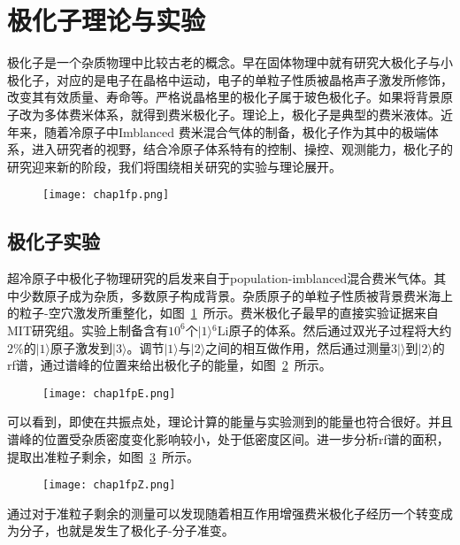 \section{极化子理论与实验}
极化子是一个杂质物理中比较古老的概念。早在固体物理中就有研究大极化子与小极化子\cite{landau1933bewegung,pekar1946autolocalization,frohlich1950xx,frohlich1954electrons,feynman1955slow,mahanmany}，对应的是电子在晶格中运动，电子的单粒子性质被晶格声子激发所修饰，改变其有效质量、寿命等。严格说晶格里的极化子属于玻色极化子。如果将背景原子改为多体费米体系，就得到费米极化子。理论上，极化子是典型的费米液体。近年来，随着冷原子中Imblanced 费米混合气体的制备，极化子作为其中的极端体系，进入研究者的视野，结合冷原子体系特有的控制、操控、观测能力，极化子的研究迎来新的阶段，我们将围绕相关研究的实验与理论展开。
\begin{figure}[!htbp]
    \centering
    \texttt{[image: chap1fp.png]}
    \label{fp}
\end{figure}

\subsection{极化子实验}
超冷原子中极化子物理研究的启发来自于population-imblanced混合费米气体。其中少数原子成为杂质，多数原子构成背景。杂质原子的单粒子性质被背景费米海上的粒子-空穴激发所重整化，如图~\ref{fp}~所示。费米极化子最早的直接实验证据来自MIT研究组\cite{Schirotzekobservation}。实验上制备含有$10^6$个$|1\rangle{}^6$Li原子的体系。然后通过双光子过程将大约$2\%$的$|1\rangle$原子激发到$|3\rangle$。调节$|1\rangle$与$|2\rangle$之间的相互做作用，然后通过测量$3|\rangle$到$|2\rangle$的rf谱，通过谱峰的位置来给出极化子的能量，如图~\ref{fpE}~所示。
\begin{figure}[!htbp]
    \centering
    \texttt{[image: chap1fpE.png]}
    \label{fpE}
\end{figure}

可以看到，即使在共振点处，理论计算的能量与实验测到的能量也符合很好。并且谱峰的位置受杂质密度变化影响较小，处于低密度区间。进一步分析rf谱的面积，提取出准粒子剩余，如图~\ref{fpZ}~所示。
\begin{figure}[!htbp]
    \centering
    \texttt{[image: chap1fpZ.png]}
    \label{fpZ}
\end{figure}
通过对于准粒子剩余的测量可以发现随着相互作用增强费米极化子经历一个转变成为分子，也就是发生了极化子-分子准变。

